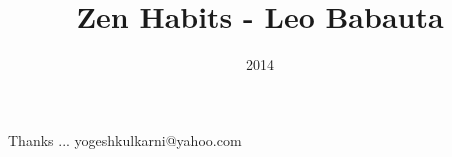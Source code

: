 \documentclass[xcolor=dvipsnames,compress,t,pdf]{beamer}
\title[Zen Habits \hspace{4cm} \insertframenumber /\inserttotalframenumber]
{Zen Habits - Leo Babauta}
\subtitle[]{}
\date{2014}
\begin{document}
\begin{frame}
\titlepage
\end{frame}




\begin{frame}[c]{}
Thanks ...
\vspace{5mm}
yogeshkulkarni@yahoo.com
\end{frame}
\end{document}
